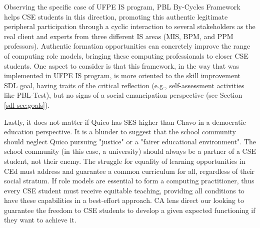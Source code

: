 Observing the specific case of \acrfull{UFPE} \acrfull{IS} program, \acrfull{PBL} By-Cycles Framework helps \gls{CSE} students in this direction, promoting this authentic legitimate peripheral participation through a cyclic interaction to several stakeholders as the real client and experts from three different \gls{IS} areas (\acrfull{MIS}, \acrfull{BPM}, and \acrfull{PPM} professors). Authentic formation opportunities can concretely improve the range of computing role models, bringing these computing professionals to closer \gls{CSE} students. One aspect to consider is that this framework, in the way that was implemented in \acrshort{UFPE} \acrshort{IS} program, is more oriented to the skill improvement \gls{SDL} goal, having traits of the critical reflection (e.g., self-assessment activities like \acrshort{PBL}-Test), but no signs of a social emancipation perspective (see Section \ref{sdl-sec:goals}).

Lastly, it does not matter if Quico has \acrfull{SES} higher than Chavo in a democratic education perspective. It is a blunder to suggest that the school community should neglect Quico pursuing "justice" or a "fairer educational environment". The school community (in this case, a university) should always be a partner of a \gls{CSE} student, not their enemy. The struggle for equality of learning opportunities in \gls{CEd} must address and guarantee a common curriculum for all, regardless of their social stratum. If role models are essential to form a computing practitioner, thus every \gls{CSE} student must receive equitable teaching, providing all conditions to have these capabilities in a best-effort approach. \gls{CA} lens direct our looking to guarantee the freedom to \gls{CSE} students to develop a given expected functioning if they want to achieve it.

    
